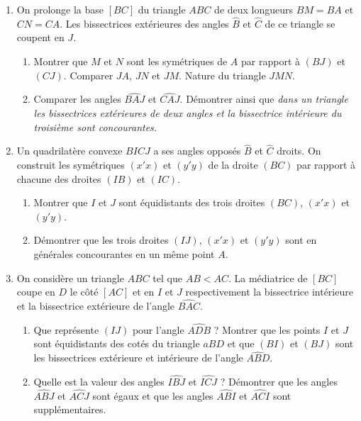 \begin{enumerate}
\item On prolonge la base $[BC]$ du triangle $ABC$ de deux longueurs $BM=BA$ et $CN=CA$. Les bissectrices extérieures des angles $\widehat{B}$ et $\widehat{C}$ de ce triangle se coupent en $J$. \begin{enumerate}
\item Montrer que $M$ et $N$ sont les symétriques de $A$ par rapport à $(BJ)$ et $(CJ)$. Comparer $JA$, $JN$ et $JM$. Nature du triangle $JMN$. 
\item Comparer les angles $\widehat{BAJ}$ et $\widehat{CAJ}$. Démontrer ainsi que
\emph{dans un triangle les bissectrices extérieures de deux angles et la bissectrice
intérieure du troisième sont concourantes.}
\end{enumerate}
\item Un quadrilatère convexe $BICJ$ a ses angles opposés $\widehat{B}$ et $\widehat{C}$ droits. On construit les symétriques $(x'x)$ et $(y'y)$ de la droite 
$(BC)$ par rapport à chacune des droites $(IB)$ et $(IC)$. 
\begin{enumerate}
\item Montrer que $I$ et $J$ sont équidistants des trois droites $(BC)$, $(x'x)$ et 
$(y'y)$.
\item Démontrer que les trois droites $(IJ)$, $(x'x)$ et $(y'y)$ sont en générales 
concourantes en un même point $A$.
\end{enumerate}
\item On considère un triangle $ABC$ tel que $AB<AC$. La médiatrice de $[BC]$ coupe en $D$ le côté $[AC]$ et en $I$ et $J$ respectivement la bissectrice intérieure et la
bissectrice extérieure de l'angle $\widehat{BAC}$. \begin{enumerate}
\item Que représente $(IJ)$ pour l'angle $\widehat{ADB}$ ? Montrer que les points $I$ et $J$ sont équidistants des cotés du triangle $aBD$ et que $(BI)$ et $(BJ)$ sont 
les bissectrices extérieure et intérieure de l'angle $\widehat{ABD}$. 
\item Quelle est la valeur des angles $\widehat{IBJ}$ et $\widehat{ICJ}$ ? Démontrer que les angles $\widehat{ABJ}$ et $\widehat{ACJ}$ sont égaux et que les angles $\widehat{ABI}$ et $\widehat{ACI}$ sont supplémentaires.
\end{enumerate}
\end{enumerate}